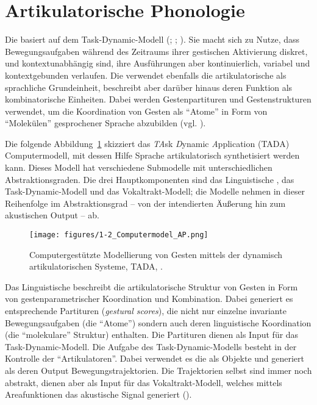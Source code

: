 \section{Artikulatorische Phonologie}
\label{sec:0102}

Die  basiert auf dem Task-Dynamic-Modell (\citealt{Browman1986}; \citealt{Browman1988}; \citealt{Browman1991a}). Sie macht sich zu Nutze, dass Bewegungsaufgaben während des Zeitraums ihrer gestischen Aktivierung diskret,  und kontextunabhängig sind, ihre Ausführungen aber kontinuierlich, variabel und kontextgebunden verlaufen. Die  verwendet ebenfalls die artikulatorische  als sprachliche Grundeinheit, beschreibt aber darüber hinaus deren Funktion als kombinatorische Einheiten. Dabei werden Gestenpartituren und Gestenstrukturen verwendet, um die Koordination von Gesten als \enquote{Atome} in Form von \enquote{Molekülen} gesprochener Sprache abzubilden (vgl. \citealt{Pouplier2011a}).

Die folgende Abbildung~\ref{figure:0102} skizziert das \emph{TA}sk \emph{D}ynamic \emph{A}pplication (TADA) Computermodell, mit dessen Hilfe Sprache artikulatorisch synthetisiert werden kann. Dieses Modell hat verschiedene Submodelle mit unterschiedlichen Abstraktionsgraden. Die drei Hauptkomponenten sind das Linguistische , das Task-Dynamic-Modell und das Vokaltrakt-Modell; die Modelle nehmen in dieser Reihenfolge im Abstraktionsgrad -- von der intendierten Äußerung hin zum akustischen Output -- ab.

\begin{figure}[ht]
	\texttt{[image: figures/1-2\_Computermodel\_AP.png]}
	\caption{Computergestützte Modellierung von Gesten mittels der dynamisch artikulatorischen Systeme, TADA, \citealt[nach][342]{Browman1991a}.}
	\label{figure:0102}
\end{figure}

Das Linguistische  beschreibt die artikulatorische Struktur von Gesten in Form von gestenparametrischer Koordination und Kombination. Dabei generiert es entsprechende Partituren (\emph{gestural scores}), die nicht nur einzelne invariante Bewegungsaufgaben (die \enquote{Atome}) sondern auch deren linguistische Koordination (die \enquote{molekulare} Struktur) enthalten. Die Partituren dienen als Input für das Task-Dynamic-Modell. Die Aufgabe des Task-Dynamic-Modells besteht in der Kontrolle der \enquote{Artikulatoren}. Dabei verwendet es die  als Objekte und generiert als deren Output Bewegungstrajektorien. Die Trajektorien selbst sind immer noch abstrakt, dienen aber als Input für das Vokaltrakt-Modell, welches mittels Areafunktionen das akustische Signal generiert (\citealt{Browman1991a}).

